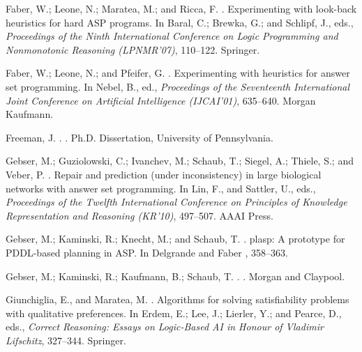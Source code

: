 \begin{thebibliography}{}
Faber, W.; Leone, N.; Maratea, M.; and Ricca, F.
.
\newblock Experimenting with look-back heuristics for hard {ASP} programs.
\newblock In Baral, C.; Brewka, G.; and Schlipf, J., eds., {\em Proceedings of
  the Ninth International Conference on Logic Programming and Nonmonotonic
  Reasoning (LPNMR'07)},  110--122.
\newblock Springer.

Faber, W.; Leone, N.; and Pfeifer, G.
.
\newblock Experimenting with heuristics for answer set programming.
\newblock In Nebel, B., ed., {\em Proceedings of the Seventeenth International
  Joint Conference on Artificial Intelligence (IJCAI'01)},  635--640.
\newblock Morgan Kaufmann.

Freeman, J.
.
.
\newblock Ph.D. Dissertation, University of Pennsylvania.

Gebser, M.; Guziolowski, C.; Ivanchev, M.; Schaub, T.; Siegel, A.; Thiele, S.;
  and Veber, P.
.
\newblock Repair and prediction (under inconsistency) in large biological
  networks with answer set programming.
\newblock In Lin, F., and Sattler, U., eds., {\em Proceedings of the Twelfth
  International Conference on Principles of Knowledge Representation and
  Reasoning (KR'10)},  497--507.
\newblock AAAI Press.

Gebser, M.; Kaminski, R.; Knecht, M.; and Schaub, T.
.
\newblock plasp: A prototype for {PDDL}-based planning in {ASP}.
\newblock In Delgrande and Faber ,  358--363.

Gebser, M.; Kaminski, R.; Kaufmann, B.; Schaub, T.
.
.
\newblock  Morgan and Claypool.


Giunchiglia, E., and Maratea, M.
.
\newblock Algorithms for solving satisfiability problems with qualitative
  preferences.
\newblock In Erdem, E.; Lee, J.; Lierler, Y.; and Pearce, D., eds., {\em
  Correct Reasoning: Essays on Logic-Based {AI} in Honour of {V}ladimir
  {L}ifschitz},
  327--344.
\newblock Springer.


\end{thebibliography}
